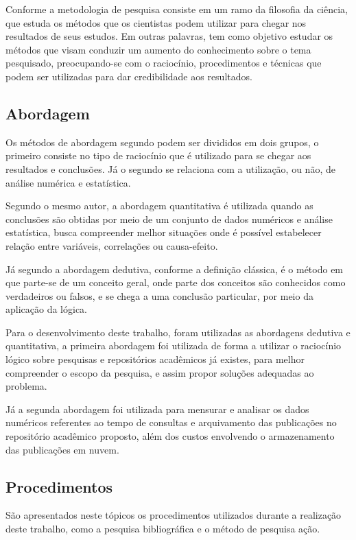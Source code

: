 Conforme \citep[p. 15]{LOVATO:metodologia} a metodologia de pesquisa
consiste em um ramo da filosofia da ciência, que estuda os métodos que
os cientistas podem utilizar para chegar nos resultados de seus estudos.
Em outras palavras, tem como objetivo estudar os métodos que visam
conduzir um aumento do conhecimento sobre o tema pesquisado, preocupando-se
com o raciocínio, procedimentos e técnicas que podem ser utilizadas para
dar credibilidade aos resultados.

\subsection{Abordagem}

Os métodos de abordagem segundo \citep[p. 29]{LOVATO:metodologia} podem ser
divididos em dois grupos, o primeiro consiste no tipo de raciocínio que
é utilizado para se chegar aos resultados e conclusões. Já o segundo
se relaciona com a utilização, ou não, de análise numérica e estatística.

Segundo o mesmo autor, a abordagem quantitativa é utilizada quando
as conclusões são obtidas por meio de um conjunto de dados numéricos
e análise estatística, busca compreender melhor situações onde é possível
estabelecer relação entre variáveis, correlações ou causa-efeito.

Já segundo \cite{GIL:metodologia} a abordagem dedutiva, conforme a definição clássica,
é o método em que parte-se de um conceito geral, onde parte dos
conceitos são conhecidos como verdadeiros ou falsos, e se chega
a uma conclusão particular, por meio da aplicação da lógica.

Para o desenvolvimento deste trabalho, foram utilizadas as abordagens
dedutiva e quantitativa, a primeira abordagem foi utilizada
de forma a utilizar o raciocínio lógico sobre pesquisas e repositórios
acadêmicos já existes, para melhor compreender o escopo da pesquisa,
e assim propor soluções adequadas ao problema.

Já a segunda abordagem foi utilizada para mensurar e analisar
os dados numéricos referentes ao tempo de consultas e arquivamento
das publicações no repositório acadêmico proposto, além dos
custos envolvendo o armazenamento das publicações em nuvem.

\subsection{Procedimentos}

São apresentados neste tópicos os procedimentos utilizados
durante a realização deste trabalho, como a pesquisa bibliográfica e
o método de pesquisa ação.


